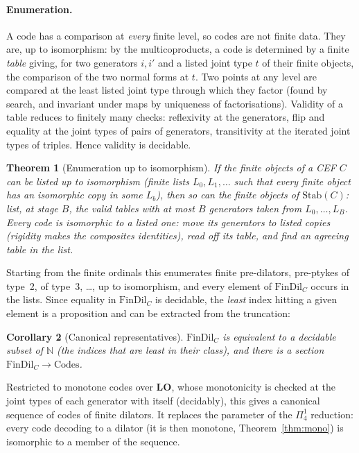 \documentclass[11pt]{article}
\newtheorem{theorem}{Theorem}[section]
\newtheorem{corollary}[theorem]{Corollary}
\theoremstyle{definition}
\theoremstyle{remark}
\newcommand{\Stab}{\mathrm{Stab}}
\newcommand{\LO}{\mathbf{LO}}
\begin{document}
\paragraph{Enumeration.} A code has a comparison at \emph{every} finite
level, so codes are not finite data. They are, up to isomorphism: by the
multicoproducts, a code is determined by a finite \emph{table} giving, for
two generators $i,i'$ and a listed joint type $t$ of their finite objects,
the comparison of the two normal forms at $t$. Two points at any level are
compared at the least listed joint type through which they factor (found
by search, and invariant under maps by uniqueness of factorisations).
Validity of a table reduces to finitely many checks: reflexivity at the
generators, flip and equality at the joint types of pairs of generators,
transitivity at the iterated joint types of triples. Hence validity is
decidable.

\begin{theorem}[Enumeration up to isomorphism]
If the finite objects of a CEF $C$ can be listed up to isomorphism (finite
lists $L_0,L_1,\ldots$ such that every finite object has an isomorphic copy
in some $L_b$), then so can the finite objects of $\Stab(C)$: list, at
stage $B$, the valid tables with at most $B$ generators taken from
$L_0,\ldots,L_B$. Every code is isomorphic to a listed one: move its
generators to listed copies (rigidity makes the composites identities),
read off its table, and find an agreeing table in the list.
\end{theorem}

Starting from the finite ordinals this enumerates finite pre-dilators,
pre-ptykes of type~2, of type~3, \dots, up to isomorphism, and every element
of $\mathrm{FinDil}_C$ occurs in the lists. Since equality in
$\mathrm{FinDil}_C$ is decidable, the \emph{least} index hitting a given
element is a proposition and can be extracted from the truncation:

\begin{corollary}[Canonical representatives]
$\mathrm{FinDil}_C$ is equivalent to a decidable subset of $\mathbb{N}$
(the indices that are least in their class), and there is a section
$\mathrm{FinDil}_C\to\mathrm{Codes}$.
\end{corollary}

Restricted to monotone codes over $\LO$, whose monotonicity is checked at the
joint types of each generator with itself (decidably), this gives a
canonical sequence of codes of finite dilators. It replaces the parameter
of the $\Pi^1_4$ reduction: every code decoding to a dilator (it is then
monotone, Theorem~\ref{thm:mono}) is isomorphic to a member of the
sequence.
\end{document}
